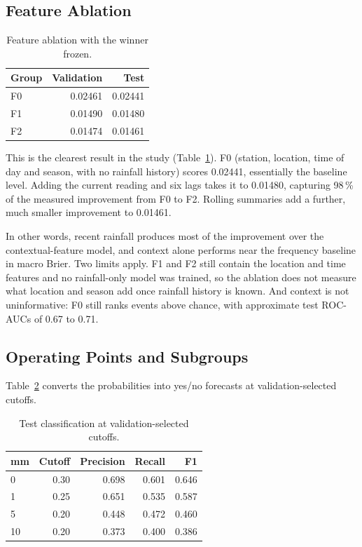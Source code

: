\documentclass[10pt,a4paper,twocolumn,twoside]{rho-class/rho}
\begin{document}
\subsection{Feature Ablation}
\begin{table}[H]
\caption{Feature ablation with the winner frozen.}
\label{tab:ablation}
\centering
\small
\setlength{\tabcolsep}{3pt}
\begin{tabular}{lrr}
\toprule
\textbf{Group} & \textbf{Validation} & \textbf{Test} \\
\midrule
F0 & 0.02461 & 0.02441 \\
F1 & 0.01490 & 0.01480 \\
F2 & 0.01474 & 0.01461 \\
\bottomrule
\end{tabular}
\end{table}

This is the clearest result in the study (Table~\ref{tab:ablation}). F0 (station, location, time of day and season, with no rainfall history) scores 0.02441, essentially the baseline level. Adding the current reading and six lags takes it to 0.01480, capturing 98\,\% of the measured improvement from F0 to F2. Rolling summaries add a further, much smaller improvement to 0.01461.

In other words, recent rainfall produces most of the improvement over the contextual-feature model, and context alone performs near the frequency baseline in macro Brier. Two limits apply. F1 and F2 still contain the location and time features and no rainfall-only model was trained, so the ablation does not measure what location and season add once rainfall history is known. And context is not uninformative: F0 still ranks events above chance, with approximate test ROC-AUCs of 0.67 to 0.71.

\subsection{Operating Points and Subgroups}
Table~\ref{tab:classification} converts the probabilities into yes/no forecasts at validation-selected cutoffs.

\begin{table}[H]
\caption{Test classification at validation-selected cutoffs.}
\label{tab:classification}
\centering
\small
\setlength{\tabcolsep}{3pt}
\begin{tabular}{lrrrr}
\toprule
\textbf{mm} & \textbf{Cutoff} & \textbf{Precision} & \textbf{Recall} & \textbf{F1} \\
\midrule
0 & 0.30 & 0.698 & 0.601 & 0.646 \\
1 & 0.25 & 0.651 & 0.535 & 0.587 \\
5 & 0.20 & 0.448 & 0.472 & 0.460 \\
10 & 0.20 & 0.373 & 0.400 & 0.386 \\
\bottomrule
\end{tabular}
\end{table}
\end{document}
